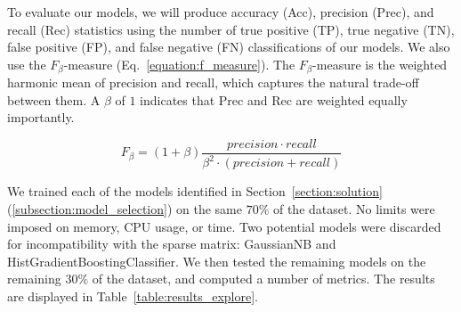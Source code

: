 \documentclass[12pt,a4paper]{article}
\begin{document}
To evaluate our models, we will produce accuracy (Acc), precision (Prec), and recall (Rec) statistics using the number of true positive (TP), true negative (TN), false positive (FP), and false negative (FN) classifications of our models. We also use the $F_\beta$-measure (Eq.~\ref{equation:f_measure}). The $F_\beta$-measure is the weighted harmonic mean of precision and recall, which captures the natural trade-off between them. A $\beta$ of $1$ indicates that Prec and Rec are weighted equally importantly.

\begin{equation}
\label{equation:f_measure}
F_\beta = (1 + \beta) \frac{precision \cdot recall}{\beta^2 \cdot (precision + recall)}
\end{equation}

 We trained each of the models identified in Section~\ref{section:solution} (\ref{subsection:model_selection}) on the same $70\%$ of the dataset. No limits were imposed on memory, CPU usage, or time. Two potential models were discarded for incompatibility with the sparse matrix: GaussianNB and HistGradientBoostingClassifier. We then tested the remaining models on the remaining $30\%$ of the dataset, and computed a number of metrics. The results are displayed in Table~\ref{table:results_explore}.
\end{document}
